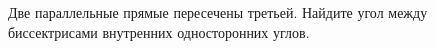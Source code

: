 \begin{ex}
	\begin{condition}
		Две параллельные прямые пересечены третьей. Найдите угол между биссектрисами внутренних односторонних углов.
	\end{condition}
\end{ex}